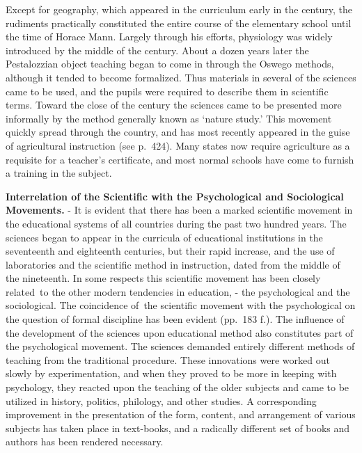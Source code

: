 \documentclass[
]{book}
\begin{document}
Except for geography, which appeared in the curriculum early in the century, the rudiments practically constituted the entire course of the elementary school until the time of Horace Mann. Largely through his efforts, physiology was widely introduced by the middle of the century. About a dozen years later the Pestalozzian object teaching began to come in through the Oswego methods, although it tended to become formalized. Thus materials in several of the sciences came to be used, and the pupils were required to describe them in scientific terms. Toward the close of the century the sciences came to be presented more informally by the method generally known as `nature study.' This movement quickly spread through the country, and has most recently appeared in the guise of agricultural instruction (see p.~424). Many states now require agriculture as a requisite for a teacher's certificate, and most normal schools have come to furnish a training in the subject.

\textbf{Interrelation of the Scientific with the Psychological and Sociological Movements.} - It is evident that there has been a marked scientific movement in the educational systems of all countries during the past two hundred years. The sciences began to appear in the curricula of educational institutions in the seventeenth and eighteenth centuries, but their rapid increase, and the use of laboratories and the scientific method in instruction, dated from the middle of the nineteenth. In some respects this scientific movement has been closely related~to the other modern tendencies in education, - the psychological and the sociological. The coincidence of~the scientific movement with the psychological on the question of formal discipline has been evident (pp.~183 f.). The influence of the development of the sciences upon educational method also constitutes part of the psychological movement. The sciences demanded entirely different methods of teaching from the traditional procedure. These innovations were worked out slowly by experimentation, and when they proved to be more in keeping with psychology, they reacted upon the teaching of the older subjects and came to be utilized in history, politics, philology, and other studies. A corresponding improvement in the presentation of the form, content, and arrangement of various subjects has taken place in text-books, and a radically different set of books and authors has been rendered necessary.
\end{document}
